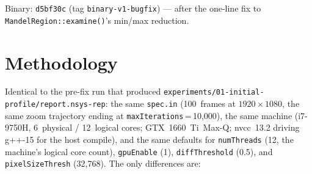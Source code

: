 \documentclass[
	english,
	letterpaper, oneside
]{article}
\begin{document}
\templatePagecfg
\templateFinalcfg

\inserttitle

\begin{center}\small\textsf{%
Binary: \texttt{d5bf30c} (tag \texttt{binary-v1-bugfix}) --- after the one-line fix to \texttt{MandelRegion::examine()}'s min/max reduction.%
}\end{center}

\begin{abstract}
This report re-runs the Nsight Systems profile of \texttt{mandelHybrid}
after the one-line bug fix to \texttt{MandelRegion::examine()}'s min/max
tracking loop documented in \texttt{03-bug-analysis.tex}, and compares the new
measurements against the pre-fix baseline of
\texttt{01-initial-profile.tex}. The methodology is identical: 100
frames at $1920 \times 1080$ on an i7-9750H + GTX~1660~Ti~Max-Q with
12 threads (1~GPU~+~11~CPU), invoked as
\texttt{nsys profile --trace=cuda,nvtx,osrt -o report ./mandelHybrid spec.in}.
The fix produced visible, mostly-expected changes in the work-decomposition
metrics: +12\% more \texttt{examine()} calls (6{,}104~$\to$~6{,}836),
+12\% more leaf regions (4{,}603~$\to$~5{,}152, with the CPU pool
absorbing most of the increase: 1{,}060~$\to$~1{,}414), -26\%
average CPU region time (535~ms~$\to$~398~ms), and -70\% in the
GPU region maximum (465.7~ms~$\to$~139.4~ms). The single most striking
finding, however, is that the 15.3~s CPU outlier survived the fix,
landing at 14.2~s in the new run. The bug fix is therefore a
correctness improvement that does what its analysis predicted (more splits,
tighter tails on the GPU side), but the long-tail CPU outlier is now
confirmed to be caused by the intrinsic weakness of the four-corner
heuristic rather than the tracking bug.
\end{abstract}

\section{Methodology}

Identical to the pre-fix run that produced
\texttt{experiments/01-initial-profile/report.nsys-rep}: the same \texttt{spec.in}
(100~frames at $1920 \times 1080$, the same zoom trajectory ending at
\texttt{maxIterations}\,=\,10{,}000), the same machine (i7-9750H,
6~physical / 12~logical cores; GTX~1660~Ti~Max-Q; nvcc~13.2 driving
g++-15 for the host compile), and the same defaults for
\texttt{numThreads} (12, the machine's logical core count),
\texttt{gpuEnable} (1), \texttt{diffThreshold} (0.5), and
\texttt{pixelSizeThresh} (32{,}768). The only differences are:
\end{document}
